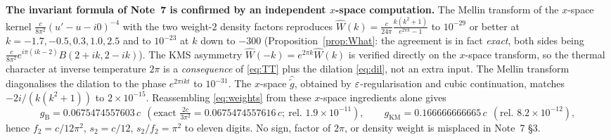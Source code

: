 \documentclass[11pt]{article}
\newcommand{\Wh}{\widehat W}
\newcommand{\gh}{\widehat{\widetilde g}}
\newcommand{\gB}{g_{\mathrm B}}
\newcommand{\gKM}{g_{\mathrm{KM}}}
\begin{document}
\begin{verdictok}
\textbf{The invariant formula of Note~7 is confirmed by an independent $x$-space computation.}
The Mellin transform of the $x$-space kernel $\frac{c}{8\pi^2}(u'-u-i0)^{-4}$ with the two weight-$2$
density factors reproduces $\Wh(k)=\frac{c}{24\pi}\frac{k(k^2+1)}{e^{2\pi k}-1}$ to $10^{-29}$ or
better at $k=-1.7,-0.5,0.3,1.0,2.5$ and to $10^{-23}$ at $k$ down to $-300$
(Proposition~\ref{prop:What}: the agreement is in fact \emph{exact}, both sides being
$\frac{c}{8\pi^2}e^{i\pi(ik-2)}B(2+ik,2-ik)$).  The KMS asymmetry $\Wh(-k)=e^{2\pi k}\Wh(k)$ is
verified directly on the $x$-space transform, so the thermal character at inverse temperature $2\pi$ is
a \emph{consequence} of \eqref{eq:TT} plus the dilation \eqref{eq:dil}, not an extra input.  The
Mellin transform diagonalises the dilation to the phase $e^{2\pi ikt}$ to $10^{-31}$.  The $x$-space
$\gh$, obtained by $\varepsilon$-regularisation and cubic continuation, matches $-2i/(k(k^2+1))$ to
$2\times10^{-15}$.  Reassembling \eqref{eq:weights} from these $x$-space ingredients alone gives
\[ \gB=0.0675474557603\,c\ \ (\text{exact }\tfrac{2c}{3\pi^2}=0.0675474557616\,c;\ \text{rel. }1.9\times10^{-11}),\qquad
   \gKM=0.166666666665\,c\ \ (\text{rel. }8.2\times10^{-12}),\]
hence $f_2=c/12\pi^2$, $s_2=c/12$, $s_2/f_2=\pi^2$ to eleven digits.  No sign, factor of $2\pi$, or
density weight is misplaced in Note~7 \S3.
\end{verdictok}
\end{document}
